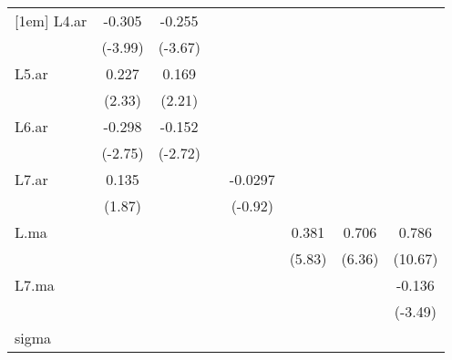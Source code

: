 {\begin{tabular}{l*{7}{c}}
[1em]
L4.ar       &      -0.305\sym{***}&      -0.255\sym{***}&                     &                     &                     &                     &                     \\
            &     (-3.99)         &     (-3.67)         &                     &                     &                     &                     &                     \\
[1em]
L5.ar       &       0.227\sym{*}  &       0.169\sym{*}  &                     &                     &                     &                     &                     \\
            &      (2.33)         &      (2.21)         &                     &                     &                     &                     &                     \\
[1em]
L6.ar       &      -0.298\sym{**} &      -0.152\sym{**} &                     &                     &                     &                     &                     \\
            &     (-2.75)         &     (-2.72)         &                     &                     &                     &                     &                     \\
[1em]
L7.ar       &       0.135         &                     &                     &     -0.0297         &                     &                     &                     \\
            &      (1.87)         &                     &                     &     (-0.92)         &                     &                     &                     \\
[1em]
L.ma        &                     &                     &                     &                     &       0.381\sym{***}&       0.706\sym{***}&       0.786\sym{***}\\
            &                     &                     &                     &                     &      (5.83)         &      (6.36)         &     (10.67)         \\
[1em]
L7.ma       &                     &                     &                     &                     &                     &                     &      -0.136\sym{***}\\
            &                     &                     &                     &                     &                     &                     &     (-3.49)         \\
\hline
sigma       &                     &                     &                     &                     &                     &                     &                     \\

\end{tabular}}
